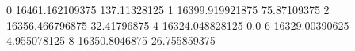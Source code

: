 0 16461.162109375 137.11328125
1 16399.919921875 75.87109375
2 16356.466796875 32.41796875
4 16324.048828125 0.0
6 16329.00390625 4.955078125
8 16350.8046875 26.755859375
